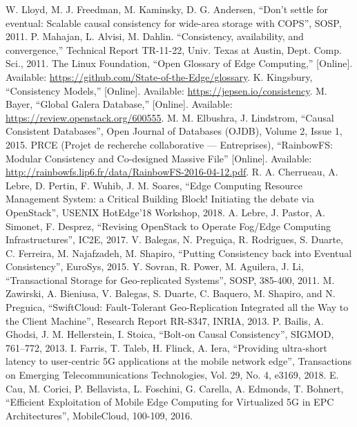 \documentclass[conference]{IEEEtran}
\begin{document}
\begin{thebibliography}{00}
 W. Lloyd, M. J. Freedman, M. Kaminsky, D. G. Andersen, ``Don’t settle for eventual: Scalable causal consistency for wide-area storage with COPS'', SOSP, 2011.
 P. Mahajan, L. Alvisi, M. Dahlin. ``Consistency, availability, and convergence,'' Technical Report TR-11-22, Univ. Texas at Austin, Dept. Comp. Sci., 2011. \newpage
{} The Linux Foundation, ``Open Glossary of Edge Computing,'' [Online]. \newline Available: \url{https://github.com/State-of-the-Edge/glossary}.
 K. Kingsbury, ``Consistency Models,'' [Online]. Available: \newline \url{https://jepsen.io/consistency}.
 M. Bayer, ``Global Galera Database,'' [Online]. Available: \newline \url{https://review.openstack.org/600555}.
 M. M. Elbushra, J. Lindstrom, ``Causal Consistent Databases'', Open Journal of Databases (OJDB), Volume 2, Issue 1, 2015.
 PRCE (Projet de recherche collaborative — Entreprises), ``RainbowFS: Modular Consistency and Co-designed Massive File'' [Online]. Available: \url{http://rainbowfs.lip6.fr/data/RainbowFS-2016-04-12.pdf}.
 R. A. Cherrueau, A. Lebre, D. Pertin, F. Wuhib, J. M. Soares, ``Edge Computing Resource Management System: a Critical Building Block! Initiating the debate via OpenStack'', USENIX HotEdge’18 Workshop, 2018.
 A. Lebre, J. Pastor, A. Simonet, F. Desprez, ``Revising OpenStack to Operate Fog/Edge Computing Infrastructures'', IC2E, 2017.
 V. Balegas, N. Preguiça, R. Rodrigues, S. Duarte, C. Ferreira, M. Najafzadeh, M. Shapiro, ``Putting Consistency back into Eventual Consistency'', EuroSys, 2015.
 Y. Sovran, R. Power, M. Aguilera, J. Li, ``Transactional Storage for Geo-replicated Systems'', SOSP, 385-400, 2011.
 M. Zawirski, A. Bieniusa, V. Balegas, S. Duarte, C. Baquero, M. Shapiro, and N. Preguica, ``SwiftCloud: Fault-Tolerant Geo-Replication Integrated all the Way to the Client Machine'', Research Report RR-8347, INRIA, 2013.
 P. Bailis, A. Ghodsi, J. M. Hellerstein, I. Stoica, ``Bolt-on Causal Consistency'', SIGMOD, 761–772, 2013.
 I. Farris, T. Taleb, H. Flinck, A. Iera, ``Providing ultra‐short latency to user‐centric 5G applications at the mobile network edge'', Transactions on Emerging Telecommunications Technologies, Vol. 29, No. 4, e3169, 2018.
 E. Cau, M. Corici, P. Bellavista, L. Foschini, G. Carella, A. Edmonds, T. Bohnert, ``Efficient Exploitation of Mobile Edge Computing for Virtualized 5G in EPC Architectures'', MobileCloud, 100-109, 2016.

\end{thebibliography}
\end{document}
